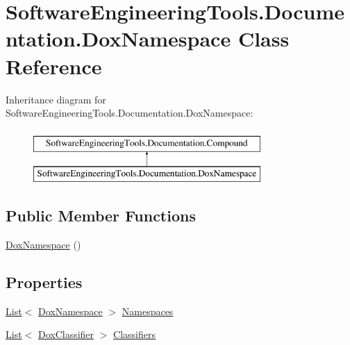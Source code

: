 \hypertarget{class_software_engineering_tools_1_1_documentation_1_1_dox_namespace}{\section{Software\+Engineering\+Tools.\+Documentation.\+Dox\+Namespace Class Reference}
\label{class_software_engineering_tools_1_1_documentation_1_1_dox_namespace}
}
Inheritance diagram for Software\+Engineering\+Tools.\+Documentation.\+Dox\+Namespace\+:\begin{figure}[H]
\begin{center}
\leavevmode
\includegraphics[height=2.000000cm]{class_software_engineering_tools_1_1_documentation_1_1_dox_namespace}
\end{center}
\end{figure}
\subsection*{Public Member Functions}
\begin{DoxyCompactItemize}
\item 
\hyperlink{class_software_engineering_tools_1_1_documentation_1_1_dox_namespace_a0f396967efcdfb9c5a5ae52b7bbe6154}{Dox\+Namespace} ()
\end{DoxyCompactItemize}
\subsection*{Properties}
\begin{DoxyCompactItemize}
\item 
\hyperlink{namespace_software_engineering_tools_1_1_documentation_ae0bccf4f49a76db084c1c316e5954ec9a4ee29ca12c7d126654bd0e5275de6135}{List}$<$ \hyperlink{class_software_engineering_tools_1_1_documentation_1_1_dox_namespace}{Dox\+Namespace} $>$ \hyperlink{class_software_engineering_tools_1_1_documentation_1_1_dox_namespace_ae5b4d40bbeb72d6f0edb2e32702e9048}{Namespaces}
\item 
\hyperlink{namespace_software_engineering_tools_1_1_documentation_ae0bccf4f49a76db084c1c316e5954ec9a4ee29ca12c7d126654bd0e5275de6135}{List}$<$ \hyperlink{class_software_engineering_tools_1_1_documentation_1_1_dox_classifier}{Dox\+Classifier} $>$ \hyperlink{class_software_engineering_tools_1_1_documentation_1_1_dox_namespace_a170f5f7f191fda80b5671172155d8cba}{Classifiers}
\end{DoxyCompactItemize}


